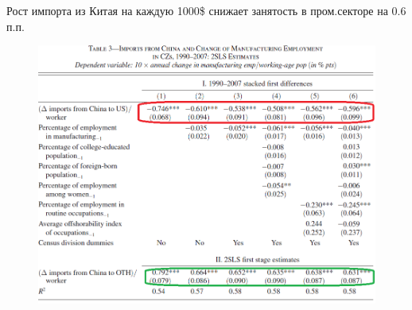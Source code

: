 \begin{frame}{Рост импорта из Китая на каждую 1000\$ снижает занятость в пром.секторе на 0.6 п.п.}
   \begin{figure}
   \centering
       \includegraphics[width=\textwidth]{Lecture_Sources/Images/Bartik_results.png}
  \end{figure}
\end{frame}